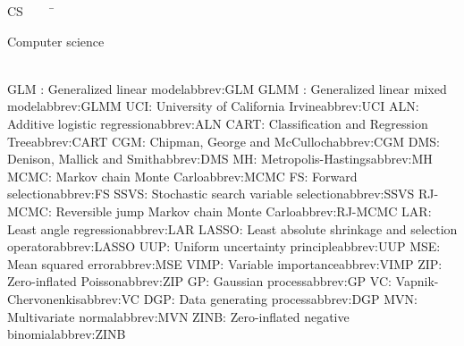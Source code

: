  
 
 
 
 
\begin{tabbing}
CS~~~~~\=\parbox{7in}{\hspace{.4in}Computer science\dotfill \pageref{abbrev:CS}}\\
\addabbrev GLM : {\hspace{.4in}Generalized linear model}{abbrev:GLM}
\addabbrev GLMM : {\hspace{.4in}Generalized linear mixed model}{abbrev:GLMM}
\addabbrev UCI: {\hspace{.4in}University of California Irvine}{abbrev:UCI}
\addabbrev ALN: {\hspace{.4in}Additive logistic regression}{abbrev:ALN}
\addabbrev CART: {\hspace{.4in}Classification and Regression Tree}{abbrev:CART}
\addabbrev CGM: {\hspace{.4in}Chipman, George and McCulloch}{abbrev:CGM}
\addabbrev DMS: {\hspace{.4in}Denison, Mallick and Smith}{abbrev:DMS}
\addabbrev MH: {\hspace{.4in}Metropolis-Hastings}{abbrev:MH}
\addabbrev MCMC: {\hspace{.4in}Markov chain Monte Carlo}{abbrev:MCMC}
\addabbrev FS: {\hspace{.4in}Forward selection}{abbrev:FS}
\addabbrev SSVS: {\hspace{.4in}Stochastic search variable selection}{abbrev:SSVS}
\addabbrev RJ-MCMC: {\hspace{.4in}Reversible jump Markov chain Monte Carlo}{abbrev:RJ-MCMC}
\addabbrev LAR: {\hspace{.4in}Least angle regression}{abbrev:LAR}
\addabbrev LASSO: {\hspace{.4in}Least absolute shrinkage and selection operator}{abbrev:LASSO}
\addabbrev UUP: {\hspace{.4in}Uniform uncertainty principle}{abbrev:UUP}
\addabbrev MSE: {\hspace{.4in}Mean squared error}{abbrev:MSE}
\addabbrev VIMP: {\hspace{.4in}Variable importance}{abbrev:VIMP}
\addabbrev ZIP: {\hspace{.4in}Zero-inflated Poisson}{abbrev:ZIP}
\addabbrev GP: {\hspace{.4in}Gaussian process}{abbrev:GP}
\addabbrev VC: {\hspace{.4in}Vapnik-Chervonenkis}{abbrev:VC}
\addabbrev DGP: {\hspace{.4in}Data generating process}{abbrev:DGP}
\addabbrev MVN: {\hspace{.4in}Multivariate normal}{abbrev:MVN}
\addabbrev ZINB: {\hspace{.4in}Zero-inflated negative binomial}{abbrev:ZINB}

\end{tabbing}